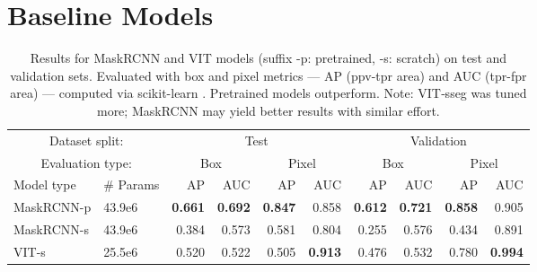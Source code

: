 \documentclass{article}
\begin{document}
\section{Baseline Models}
\label{sec:models}

\newcommand{\tb}[1]{\textbf{#1}}

\begin{table}[t]
\centering
\begin{tabular}{ll|rrrr|rrrr}
\toprule
\multicolumn{2}{c}{Dataset split:} & \multicolumn{4}{c}{Test} & \multicolumn{4}{c}{Validation} \\
\multicolumn{2}{c}{Evaluation type:} & \multicolumn{2}{c}{Box} & \multicolumn{2}{c}{Pixel} & \multicolumn{2}{c}{Box} & \multicolumn{2}{c}{Pixel} \\
Model type & \# Params & AP         & AUC        & AP         & AUC        & AP         & AUC        & AP         & AUC \\
\midrule
MaskRCNN-p & 43.9e6    & \tb{0.661} & \tb{0.692} & \tb{0.847} & 0.858      & \tb{0.612} & \tb{0.721} & \tb{0.858} & 0.905 \\
MaskRCNN-s & 43.9e6    & 0.384      & 0.573      & 0.581      & 0.804      & 0.255      & 0.576      & 0.434      & 0.891 \\
VIT-s      & 25.5e6    & 0.520      & 0.522      & 0.505      & \tb{0.913} & 0.476      & 0.532      & 0.780      & \tb{0.994} \\
\bottomrule
\end{tabular}
\caption[]{
    Results for MaskRCNN and VIT models (suffix -p: pretrained, -s: scratch) on test and validation sets.
    Evaluated with box and pixel metrics --- AP (ppv-tpr area) \cite{powers_evaluation_2011} and AUC (tpr-fpr area) --- computed via scikit-learn \cite{scikit-learn}.
    Pretrained models outperform.
    Note: VIT‑sseg was tuned more; MaskRCNN may yield better results with similar effort.
}
\label{tab:model_results}
\end{table}
\end{document}
